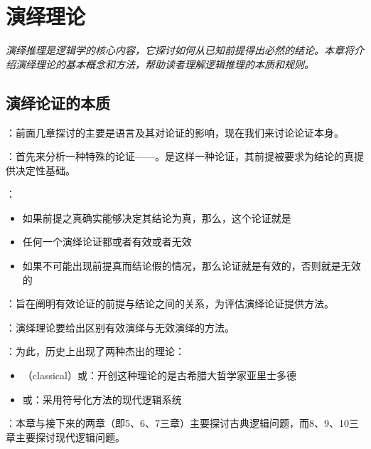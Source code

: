 \section{演绎理论}

\begin{logicbox}[title=引言]
\textit{演绎推理是逻辑学的核心内容，它探讨如何从已知前提得出必然的结论。本章将介绍演绎理论的基本概念和方法，帮助读者理解逻辑推理的本质和规则。}
\end{logicbox}

\subsection{演绎论证的本质}

\begin{theorembox}[title=演绎论证的基本概念]
：前面几章探讨的主要是语言及其对论证的影响，现在我们来讨论论证本身。

：首先来分析一种特殊的论证——。是这样一种论证，其前提被要求为结论的真提供决定性基础。

：
\begin{itemize}
  \item 如果前提之真确实能够决定其结论为真，那么，这个论证就是
  \item 任何一个演绎论证都或者有效或者无效
  \item 如果不可能出现前提真而结论假的情况，那么论证就是有效的，否则就是无效的
\end{itemize}
\end{theorembox}

\begin{theorembox}[title=演绎理论的目标与发展]
：旨在阐明有效论证的前提与结论之间的关系，为评估演绎论证提供方法。

：演绎理论要给出区别有效演绎与无效演绎的方法。

：为此，历史上出现了两种杰出的理论：
\begin{itemize}
  \item {}（classical）或：开创这种理论的是古希腊大哲学家亚里士多德
  \item {}或：采用符号化方法的现代逻辑系统
\end{itemize}

：本章与接下来的两章（即5、6、7三章）主要探讨古典逻辑问题，而8、9、10三章主要探讨现代逻辑问题。
\end{theorembox}

